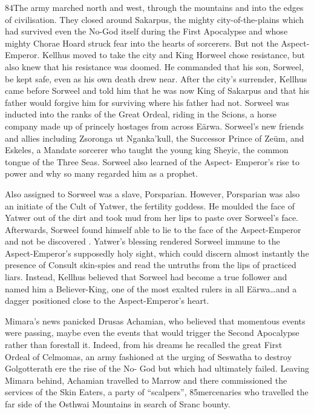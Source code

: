 \documentclass[]{book}
\begin{document}
84The army marched north and west, through the mountains and into the edges of
civilisation. They closed around Sakarpus, the mighty city-of-the-plains which had
survived even the No-God itself during the First Apocalypse and whose mighty Chorae
Hoard struck fear into the hearts of sorcerers. But not the Aspect-Emperor. Kellhus
moved to take the city and King Horweel chose resistance, but also knew that his
resistance was doomed. He commanded that his son, Sorweel, be kept safe, even as his
own death drew near. After the city's surrender, Kellhus came before Sorweel and told
him that he was now King of Sakarpus and that his father would forgive him for
surviving where his father had not. Sorweel was inducted into the ranks of the Great
Ordeal, riding in the Scions, a horse company made up of princely hostages from across
Eärwa. Sorweel's new friends and allies including Zsoronga ut Nganka'kull, the
Successor Prince of Zeüm, and Eskeles, a Mandate sorcerer who taught the young king
Sheyic, the common tongue of the Three Seas. Sorweel also learned of the Aspect-
Emperor's rise to power and why so many regarded him as a prophet.

Also assigned to Sorweel was a slave, Porsparian. However, Porsparian was also an
initiate of the Cult of Yatwer, the fertility goddess. He moulded the face of Yatwer out
of the dirt and took mud from her lips to paste over Sorweel's face. Afterwards, Sorweel
found himself able to lie to the face of the Aspect-Emperor and not be discovered .
Yatwer's blessing rendered Sorweel immune to the Aspect-Emperor's supposedly holy
sight, which could discern almost instantly the presence of Consult skin-spies and read
the untruths from the lips of practiced liars. Instead, Kellhus believed that Sorweel had
become a true follower and named him a Believer-King, one of the most exalted rulers
in all Eärwa\ldots{}and a dagger positioned close to the Aspect-Emperor's heart.

Mimara's news panicked Drusas Achamian, who believed that momentous events were
passing, maybe even the events that would trigger the Second Apocalypse rather than
forestall it. Indeed, from his dreams he recalled the great First Ordeal of Celmomas, an
army fashioned at the urging of Seswatha to destroy Golgotterath ere the rise of the No-
God but which had ultimately failed. Leaving Mimara behind, Achamian travelled to
Marrow and there commissioned the services of the Skin Eaters, a party of ``scalpers'',
85mercenaries who travelled the far side of the Osthwai Mountains in search of Sranc
bounty.
\end{document}
